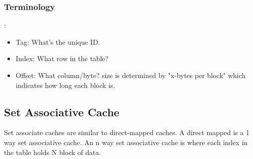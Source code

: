 \documentclass[12pt]{article}
\begin{document}
\subsubsection*{Terminology}:
\begin{itemize}
    \item Tag: What's the unique ID.
    \item Index: What row in the table?
    \item Offset: What column/byte? size is determined by "x-bytes per block" which indicates how long each block is.
\end{itemize}


\subsection*{Set Associative Cache}
Set associate caches are similar to direct-mapped caches. A direct mapped is a 1 way set associative cache.
An n way set associative cache is where each index in the table holds N block of data.


\end{document}
